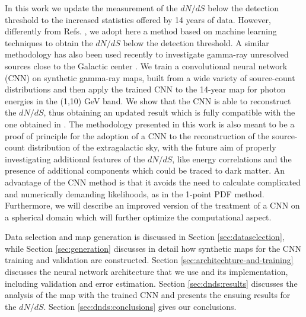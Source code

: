 In this work we update the measurement of the $dN/dS$ below the detection threshold to the increased statistics offered by 14 years of \fermi data. However, differently from Refs. \cite{Cuoco-1pdf,Zechlin:2016pme}, we adopt here a method based on machine learning techniques to obtain the $dN/dS$ below the detection threshold. 
A similar methodology has also been used recently to investigate gamma-ray unresolved sources close to the Galactic center \cite{Mishra-Sharma:2021oxe,List:2021aer,List:2020mzd}.  
We train a convolutional neural network (CNN) on synthetic gamma-ray maps, built from a wide variety of source-count distributions and then apply the trained CNN to the  14-year \fermi map for photon energies in the (1,10) GeV band. We show that the CNN is able to reconstruct the $dN/dS$, thus obtaining an updated result which is fully compatible with the one obtained in \cite{Cuoco-1pdf}. The methodology presented in this work is also meant to be a proof of principle for the adoption of a CNN to the reconstruction of the source-count distribution of the extragalactic sky, with the future aim of properly investigating additional features of the $dN/dS$, like energy correlations and the presence of additional components which could be traced to dark matter.
{  An advantage of the CNN method is that it
avoids the need to calculate complicated and numerically demanding likelihoods, as in the 1-point PDF method.
Furthermore, we will describe an improved version of the treatment of a CNN on a spherical domain which will further optimize the computational aspect.}


Data selection and \fermi map generation is discussed in Section \ref{sec:dataselection}, while Section \ref{sec:generation} discusses in detail how synthetic maps for the CNN training and validation are constructed. Section \ref{sec:architechture-and-training} discusses the neural network architecture that we use and its implementation, including validation and error estimation. Section \ref{sec:dnds:results} discusses the analysis of the \fermi map with the trained CNN and presents the ensuing results for the $dN/dS$. Section \ref{sec:dnds:conclusions} gives our conclusions.





